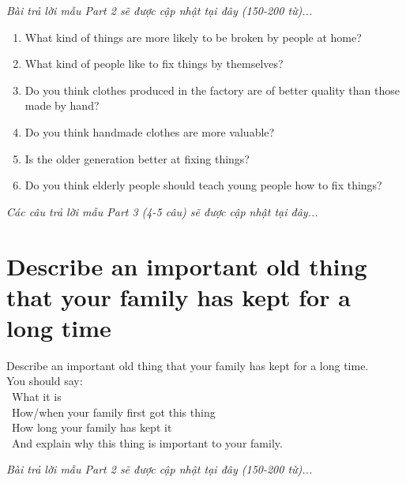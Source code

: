 \vspace{1em}
\textit{Bài trả lời mẫu Part 2 sẽ được cập nhật tại đây (150-200 từ)...}
\vspace{2em}

\begin{ieltsprompt}
\begin{enumerate}[itemsep=4pt]
    \item What kind of things are more likely to be broken by people at home?
    \item What kind of people like to fix things by themselves?
    \item Do you think clothes produced in the factory are of better quality than those made by hand?
    \item Do you think handmade clothes are more valuable?
    \item Is the older generation better at fixing things?
    \item Do you think elderly people should teach young people how to fix things?
\end{enumerate}
\end{ieltsprompt}

\vspace{1em}
\textit{Các câu trả lời mẫu Part 3 (4-5 câu) sẽ được cập nhật tại đây...}
\vspace{2em}

\section{Describe an important old thing that your family has kept for a long time}
\begin{ieltsprompt}
Describe an important old thing that your family has kept for a long time. \\
You should say: \\
\textbullet\ What it is \\
\textbullet\ How/when your family first got this thing \\
\textbullet\ How long your family has kept it \\
\textbullet\ And explain why this thing is important to your family. \\
\end{ieltsprompt}

\vspace{1em}
\textit{Bài trả lời mẫu Part 2 sẽ được cập nhật tại đây (150-200 từ)...}
\vspace{2em}

